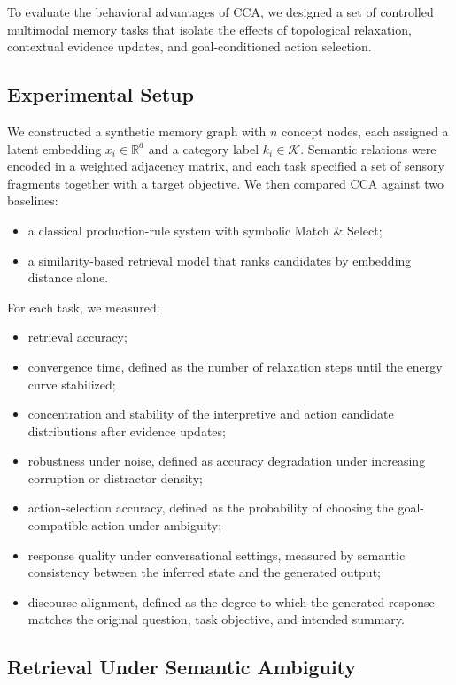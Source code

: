 \documentclass[10pt,journal,compsoc]{IEEEtran}
\begin{document}
To evaluate the behavioral advantages of CCA, we designed a set of controlled multimodal memory tasks that isolate the effects of topological relaxation, contextual evidence updates, and goal-conditioned action selection.

\subsection{Experimental Setup}

We constructed a synthetic memory graph with $n$ concept nodes, each assigned a latent embedding $x_i \in \mathbb{R}^{d}$ and a category label $k_i \in \mathcal{K}$. Semantic relations were encoded in a weighted adjacency matrix, and each task specified a set of sensory fragments together with a target objective. We then compared CCA against two baselines:
\begin{itemize}
    \item a classical production-rule system with symbolic Match \& Select;
    \item a similarity-based retrieval model that ranks candidates by embedding distance alone.
\end{itemize}

For each task, we measured:
\begin{itemize}
    \item retrieval accuracy;
    \item convergence time, defined as the number of relaxation steps until the energy curve stabilized;
    \item concentration and stability of the interpretive and action candidate distributions after evidence updates;
    \item robustness under noise, defined as accuracy degradation under increasing corruption or distractor density;
    \item action-selection accuracy, defined as the probability of choosing the goal-compatible action under ambiguity;
    \item response quality under conversational settings, measured by semantic consistency between the inferred state and the generated output;
    \item discourse alignment, defined as the degree to which the generated response matches the original question, task objective, and intended summary.
\end{itemize}

\subsection{Retrieval Under Semantic Ambiguity}
\end{document}
